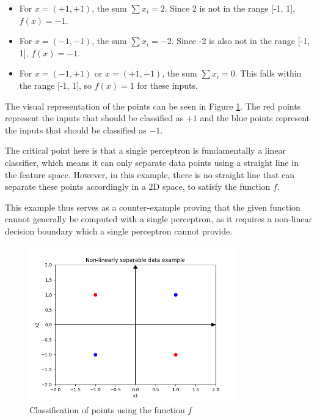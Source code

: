 \documentclass{article}
\begin{document}
\begin{itemize}
    \item For \( x = (+1, +1) \), the sum \( \sum x_i = 2 \). Since 2 is not in the range [-1, 1], \( f(x) = -1 \).
    \item For \( x = (-1, -1) \), the sum \( \sum x_i = -2 \). Since -2 is also not in the range [-1, 1], \( f(x) = -1 \).
    \item For \( x = (-1, +1) \) or \( x = (+1, -1) \), the sum \( \sum x_i = 0 \). This falls within the range [-1, 1], so \( f(x) = 1 \) for these inputs.
\end{itemize}

The visual representation of the points can be seen in Figure \ref{3a Plot}. The red points represent the inputs that should be classified as \( +1 \) and the blue points represent the inputs that should be classified as \( -1 \).

The critical point here is that a single perceptron is fundamentally a linear classifier, which means it can only separate data points using a straight line in the feature space. However, in this example, there is no straight line that can separate these points accordingly in a 2D space, to satisfy the function \( f \).

This example thus serves as a counter-example proving that the given function cannot generally be computed with a single perceptron, as it requires a non-linear decision boundary which a single perceptron cannot provide. 

\begin{figure}[H]
    \centering
    \includegraphics[width=0.8\textwidth]{"plots/3a.png"}
    \caption{Classification of points using the function \( f \)}
    \label{3a Plot}
\end{figure}
\subsubsection{}
\end{document}
